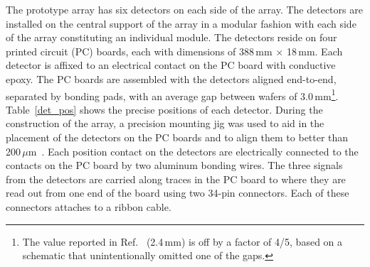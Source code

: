 The prototype array has six detectors on each side of the array.  The detectors are installed on the central support of the array in a modular fashion with each side of the array constituting an individual module.  The detectors reside on four printed circuit (PC) boards, each with dimensions of 388\,mm $\times$ 18\,mm.  Each detector is affixed to an electrical contact on the PC board with conductive epoxy.  The PC boards are assembled with the detectors aligned end-to-end, separated by bonding pads, with \label{typo4}%
an average gap between wafers of 3.0\,mm\footnote{The value reported in Ref.~\cite{Lighthall_2010} (2.4\,mm) is off by a factor of 4/5, based on a schematic that unintentionally omitted one of the gaps.}.  Table~\ref{det_pos} shows the precise positions of each detector.  During the construction of the array, a precision mounting jig was used to aid in the placement of the detectors on the PC boards and to align them to better than 200\,$\mu$m~\cite{Marley_2008}.  Each position contact on the detectors are electrically connected to the contacts on the PC board by two aluminum bonding wires.  The three signals from the detectors are carried along traces in the PC board to where they are read out from one end of the board using two 34-pin connectors.  Each of these connectors attaches to a ribbon cable.


